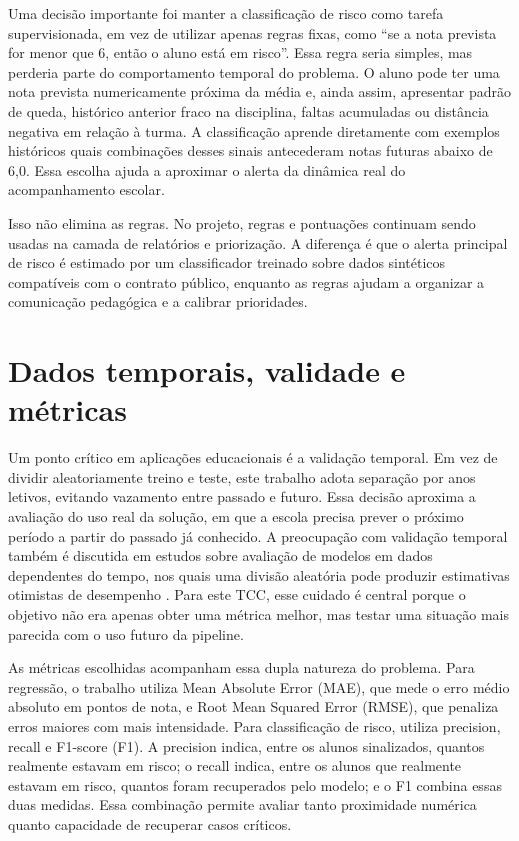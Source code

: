 Uma decis\~ao importante foi manter a classifica\c{c}\~ao de risco como tarefa supervisionada, em vez de utilizar apenas regras fixas, como ``se a nota prevista for menor que 6, ent\~ao o aluno est\'a em risco''. Essa regra seria simples, mas perderia parte do comportamento temporal do problema. O aluno pode ter uma nota prevista numericamente pr\'oxima da m\'edia e, ainda assim, apresentar padr\~ao de queda, hist\'orico anterior fraco na disciplina, faltas acumuladas ou dist\^ancia negativa em rela\c{c}\~ao \`a turma. A classifica\c{c}\~ao aprende diretamente com exemplos hist\'oricos quais combina\c{c}\~oes desses sinais antecederam notas futuras abaixo de 6,0. Essa escolha ajuda a aproximar o alerta da din\^amica real do acompanhamento escolar.

Isso n\~ao elimina as regras. No projeto, regras e pontua\c{c}\~oes continuam sendo usadas na camada de relat\'orios e prioriza\c{c}\~ao. A diferen\c{c}a \'e que o alerta principal de risco \'e estimado por um classificador treinado sobre dados sintéticos compat\'iveis com o contrato p\'ublico, enquanto as regras ajudam a organizar a comunica\c{c}\~ao pedag\'ogica e a calibrar prioridades.

\section{Dados temporais, validade e m\'etricas}
\label{sec:dados-temporais-metricas}

Um ponto cr\'itico em aplica\c{c}\~oes educacionais \'e a valida\c{c}\~ao temporal. Em vez de dividir aleatoriamente treino e teste, este trabalho adota separa\c{c}\~ao por anos letivos, evitando vazamento entre passado e futuro. Essa decis\~ao aproxima a avalia\c{c}\~ao do uso real da solu\c{c}\~ao, em que a escola precisa prever o pr\'oximo per\'iodo a partir do passado j\'a conhecido. A preocupa\c{c}\~ao com valida\c{c}\~ao temporal tamb\'em \'e discutida em estudos sobre avalia\c{c}\~ao de modelos em dados dependentes do tempo, nos quais uma divis\~ao aleat\'oria pode produzir estimativas otimistas de desempenho \cite{bergmeir2018}. Para este TCC, esse cuidado \'e central porque o objetivo n\~ao era apenas obter uma m\'etrica melhor, mas testar uma situa\c{c}\~ao mais parecida com o uso futuro da pipeline.

As m\'etricas escolhidas acompanham essa dupla natureza do problema. Para regress\~ao, o trabalho utiliza Mean Absolute Error (MAE), que mede o erro m\'edio absoluto em pontos de nota, e Root Mean Squared Error (RMSE), que penaliza erros maiores com mais intensidade. Para classifica\c{c}\~ao de risco, utiliza precision, recall e F1-score (F1). A precision indica, entre os alunos sinalizados, quantos realmente estavam em risco; o recall indica, entre os alunos que realmente estavam em risco, quantos foram recuperados pelo modelo; e o F1 combina essas duas medidas. Essa combina\c{c}\~ao permite avaliar tanto proximidade num\'erica quanto capacidade de recuperar casos cr\'iticos.

